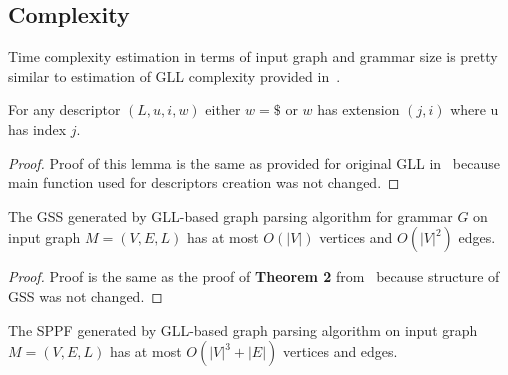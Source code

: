 \subsection{Complexity}

Time complexity estimation in terms of input graph and grammar size is pretty similar to estimation of GLL complexity provided in~\cite{gllParsingTree}.

\begin{lemma}\label{lem:Descriptors}
For any descriptor $(L,u,i,w)$ either $w = \$$ or $w$ has extension $(j,i)$ where u has index $j$.
\end{lemma}
\begin{proof}
Proof of this lemma is the same as provided for original GLL in~\cite{gllParsingTree} because main function used for descriptors creation was not changed.
\end{proof}


\begin{mytheorem}\label{thm:GSSSpace}
The GSS generated by GLL-based graph parsing algorithm for grammar $G$ on input graph $M=(V,E,L)$ has at most $O(|V|)$ vertices and $O(|V|^2)$ edges.
\end{mytheorem}

\begin{proof}

Proof is the same as the proof of \textbf{Theorem 2} from~\cite{gllParsingTree} because structure of GSS was not changed. 

\end{proof}

\begin{mytheorem}\label{thm:SPPFSpace}
The SPPF generated by GLL-based graph parsing algorithm on input graph $M=(V, E, L)$ has at most $O(|V|^3 + |E|)$ vertices and edges.
\end{mytheorem}

